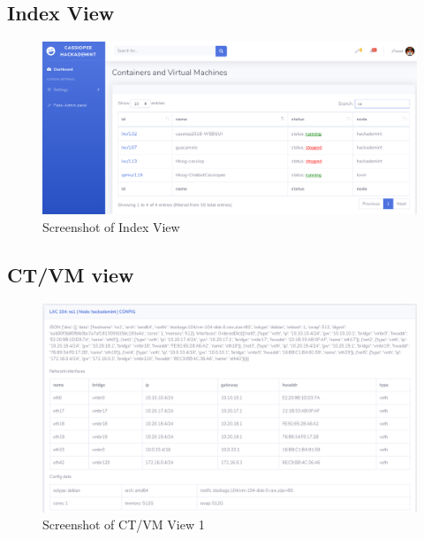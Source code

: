 \pagebreak

\subsection{Index View}

\begin{figure}[!h]
  \centering
  \includegraphics[width=1.05\textwidth]{images/flask-application-1.png}
  \caption{Screenshot of Index View}
  \label{IndexView}
\end{figure}

\pagebreak

\subsection{CT/VM view}

\begin{figure}[!h]
  \centering
  \includegraphics[width=1.05\textwidth]{images/flask-application-2.png}
  \caption{Screenshot of CT/VM View 1}
  \label{CTView}
\end{figure}

